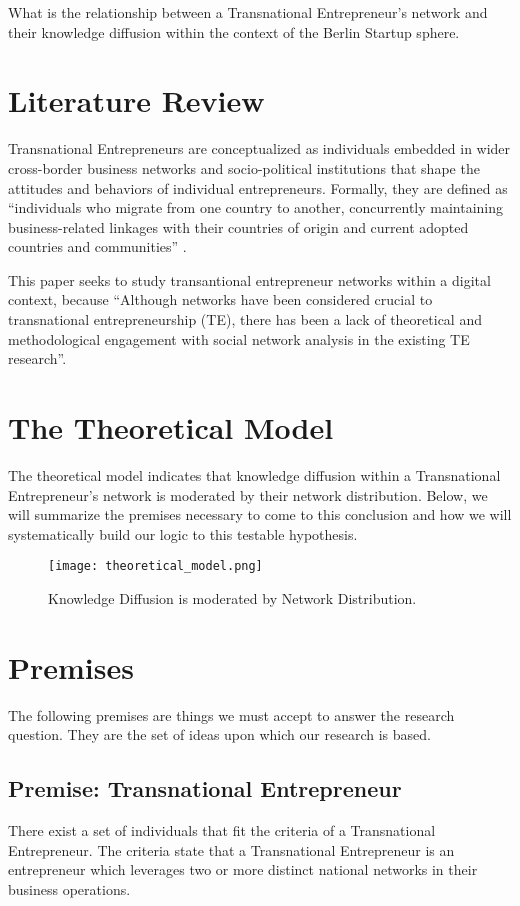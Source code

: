 What is the relationship between a Transnational Entrepreneur's
network and their knowledge diffusion within the context of the Berlin
Startup sphere.

\section{Literature Review}
Transnational Entrepreneurs are conceptualized as individuals embedded
in wider cross-border business networks and socio-political
institutions that shape the attitudes and behaviors of individual
entrepreneurs. Formally, they are defined as ``individuals who migrate
from one country to another, concurrently maintaining business-related
linkages with their countries of origin and current adopted countries
and communities'' \cite{Drori.2009}.


This paper seeks to study transantional entrepreneur networks within a
digital context, because ``Although networks have been considered
crucial to transnational entrepreneurship (TE), there has been a lack
of theoretical and methodological engagement with social network
analysis in the existing TE research''\cite{Chen.2009}.


\section{The Theoretical Model}
The theoretical model indicates that knowledge diffusion within a
Transnational Entrepreneur's network is moderated by their network
distribution. Below, we will summarize the premises necessary to come
to this conclusion and how we will systematically build our logic to
this testable hypothesis.

\begin{figure}[!ht]
  \centering
  \texttt{[image: theoretical\_model.png]}
  \caption{Knowledge Diffusion is moderated by Network Distribution.}
\end{figure}

\section{Premises}
The following premises are things we must accept to answer the
research question. They are the set of ideas upon which our research
is based.

\subsection{Premise: Transnational Entrepreneur}
There exist a set of individuals that fit the criteria of a
Transnational Entrepreneur. The criteria state that a Transnational
Entrepreneur is an entrepreneur which leverages two or more distinct
national networks in their business operations.

